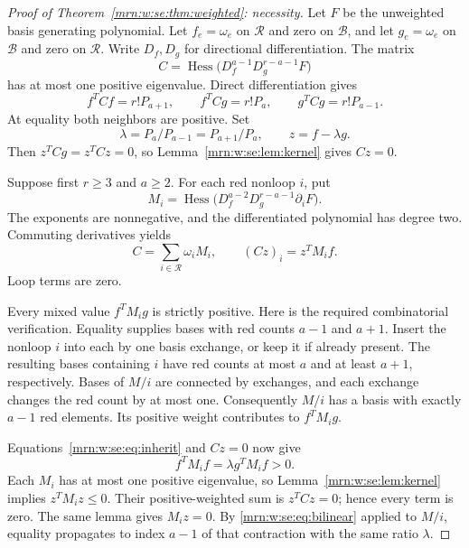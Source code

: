 \documentclass[11pt,a4paper]{article}
\theoremstyle{remark}\newtheorem{remark}[theorem]{Remark}
\newcommand{\Hess}{\operatorname{Hess}}    %
\newcommand{\RR}{\mathcal R}               %
\newcommand{\BB}{\mathcal B}               %
\begin{document}
\begin{proof}[Proof of Theorem~\ref{mrn:w:se:thm:weighted}: necessity]
Let $F$ be the unweighted basis generating polynomial. Let $f_e=\omega_e$ on $\RR$ and zero on $\BB$, and let $g_e=\omega_e$ on $\BB$ and zero on $\RR$. Write $D_f,D_g$ for directional differentiation. The matrix
\begin{equation}\label{mrn:w:se:eq:C}
 C=\Hess\big(D_f^{a-1}D_g^{r-a-1}F\big)
\end{equation}
has at most one positive eigenvalue. Direct differentiation gives
\begin{equation}\label{mrn:w:se:eq:bilinear}
 f^TCf=r!P_{a+1},\qquad f^TCg=r!P_a,\qquad g^TCg=r!P_{a-1}.
\end{equation}
At equality both neighbors are positive. Set
\[
 \lambda=P_a/P_{a-1}=P_{a+1}/P_a,\qquad z=f-\lambda g.
\]
Then $z^TCg=z^TCz=0$, so Lemma~\ref{mrn:w:se:lem:kernel} gives $Cz=0$.

Suppose first $r\ge3$ and $a\ge2$. For each red nonloop $i$, put
\begin{equation}\label{mrn:w:se:eq:Mi}
 M_i=\Hess\big(D_f^{a-2}D_g^{r-a-1}\partial_i F\big).
\end{equation}
The exponents are nonnegative, and the differentiated polynomial has degree two. Commuting derivatives yields
\begin{equation}\label{mrn:w:se:eq:inherit}
 C=\sum_{i\in\RR}\omega_i M_i,\qquad
 (Cz)_i=z^TM_i f.
\end{equation}
Loop terms are zero.

Every mixed value $f^TM_i g$ is strictly positive. Here is the required combinatorial verification. Equality supplies bases with red counts $a-1$ and $a+1$. Insert the nonloop $i$ into each by one basis exchange, or keep it if already present. The resulting bases containing $i$ have red counts at most $a$ and at least $a+1$, respectively. Bases of $M/i$ are connected by exchanges, and each exchange changes the red count by at most one. Consequently $M/i$ has a basis with exactly $a-1$ red elements. Its positive weight contributes to $f^TM_i g$.

Equations~\eqref{mrn:w:se:eq:inherit} and $Cz=0$ now give
\[
 f^TM_i f=\lambda g^TM_i f>0.
\]
Each $M_i$ has at most one positive eigenvalue, so Lemma~\ref{mrn:w:se:lem:kernel} implies $z^TM_i z\le0$. Their positive-weighted sum is $z^TCz=0$; hence every term is zero. The same lemma gives $M_i z=0$. By \eqref{mrn:w:se:eq:bilinear} applied to $M/i$, equality propagates to index $a-1$ of that contraction with the same ratio $\lambda$.


\end{proof}
\end{document}
